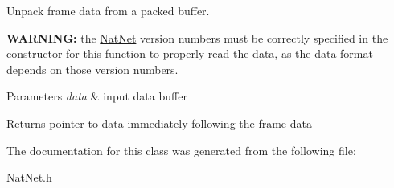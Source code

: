 \-Unpack frame data from a packed buffer. 

{\bfseries \-W\-A\-R\-N\-I\-N\-G\-:} the \hyperlink{classNatNet}{\-Nat\-Net} version numbers must be correctly specified in the constructor for this function to properly read the data, as the data format depends on those version numbers.


\begin{DoxyParams}{\-Parameters}
{\em data} & input data buffer \\
\hline
\end{DoxyParams}
\begin{DoxyReturn}{\-Returns}
pointer to data immediately following the frame data 
\end{DoxyReturn}


\-The documentation for this class was generated from the following file\-:\begin{DoxyCompactItemize}
\item 
\-Nat\-Net.\-h\end{DoxyCompactItemize}
